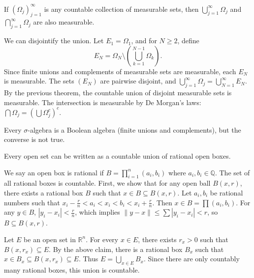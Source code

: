 \begin{theorem}
    If $(\Omega_j)_{j=1}^\infty$ is any countable collection of measurable sets, then $\bigcup_{j=1}^\infty \Omega_j$ and $\bigcap_{j=1}^\infty \Omega_j$ are also measurable.
\end{theorem}

\begin{pfbox}
    We can disjointify the union. Let $E_1 = \Omega_1$, and for $N \ge 2$, define
    \[ E_N = \Omega_N \setminus \left(\bigcup_{k=1}^{N-1} \Omega_k\right). \]
    Since finite unions and complements of measurable sets are measurable, each $E_N$ is measurable. 
    The sets $(E_N)$ are pairwise disjoint, and $\bigcup_{j=1}^\infty \Omega_j = \bigcup_{N=1}^\infty E_N$. 
    By the previous theorem, the countable union of disjoint measurable sets is measurable. 
    The intersection is measurable by De Morgan's laws: $\bigcap \Omega_j = \left(\bigcup \Omega_j^c\right)^c$.
\end{pfbox}

\begin{remark}
Every $\sigma$-algebra is a Boolean algebra (finite unions and complements), but the converse is not true.
\end{remark}

\begin{theorem}
    Every open set can be written as a countable union of rational open boxes.
\end{theorem}

\begin{pfbox}
    We say an open box is rational if $B = \prod_{i=1}^n (a_i, b_i)$ where $a_i, b_i \in \mathbb{Q}$. The set of all rational boxes is countable.
    First, we show that for any open ball $B(x,r)$, there exists a rational box $B$ such that $x \in B \subseteq B(x,r)$. 
    Let $a_i, b_i$ be rational numbers such that $x_i - \frac{r}{n} < a_i < x_i < b_i < x_i + \frac{r}{n}$.
    Then $x \in B = \prod (a_i, b_i)$. For any $y \in B$, $|y_i - x_i| < \frac{r}{n}$, which implies $\|y - x\| \le \sum |y_i - x_i| < r$, so $B \subseteq B(x,r)$.
    
    Let $E$ be an open set in $\mathbb{R}^n$. For every $x \in E$, there exists $r_x > 0$ such that $B(x, r_x) \subseteq E$. 
    By the above claim, there is a rational box $B_x$ such that $x \in B_x \subseteq B(x, r_x) \subseteq E$.
    Thus $E = \bigcup_{x \in E} B_x$. Since there are only countably many rational boxes, this union is countable.
\end{pfbox}

